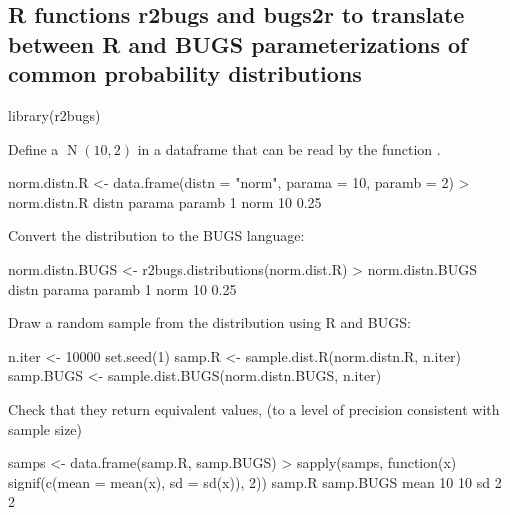 \subsection{R functions r2bugs and bugs2r to translate between R and BUGS parameterizations of common probability distributions}

\begin{example}
library(r2bugs)
\end{example}
Define a $\operatorname{N}(10,2)$ in a dataframe that can be read by the function .
\begin{example}
norm.distn.R     <- data.frame(distn = "norm", parama = 10, paramb = 2)
> norm.distn.R
distn parama paramb
1  norm     10   0.25
\end{example}
Convert the distribution to the BUGS language:  
\begin{example}
norm.distn.BUGS <- r2bugs.distributions(norm.dist.R)
> norm.distn.BUGS
distn parama paramb
1  norm     10   0.25
\end{example}
Draw a random sample from the distribution using R and BUGS:
\begin{example}
n.iter <- 10000
set.seed(1)
samp.R    <- sample.dist.R(norm.distn.R, n.iter)
samp.BUGS <- sample.dist.BUGS(norm.distn.BUGS, n.iter)
\end{example}
Check that they return equivalent values, (to a level of precision consistent with sample size)
\begin{example}
samps <- data.frame(samp.R, samp.BUGS)
> sapply(samps, function(x) signif(c(mean = mean(x), sd = sd(x)), 2))
samp.R samp.BUGS
mean     10        10
sd        2         2
\end{example}

